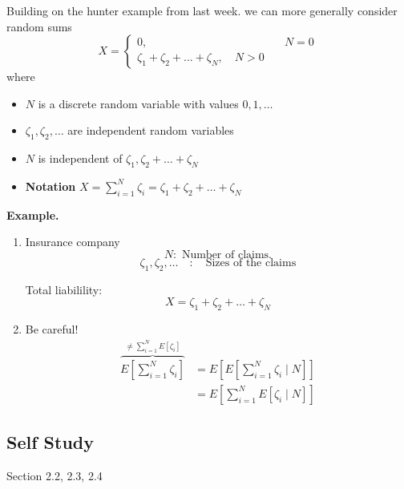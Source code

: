 \documentclass{article}
\theoremstyle{remark}
\begin{document}
Building on the hunter example from last week. we can more generally consider random sums \[
  X = \begin{cases}
    0,  &  \quad  N = 0 \\
    \zeta_{1} + \zeta _{2} + \ldots + \zeta_N , \quad  N >0
  \end{cases}
\]
where
\begin{itemize}
  \item $N$ is a discrete random variable with values $0,1, \ldots$
  \item $\zeta _{1}, \zeta _{2}, \ldots $ are independent random variables
  \item $N$ is independent of $\zeta _{1}, \zeta _{2} + \ldots + \zeta _{N}$
  \item \textbf{Notation}  $X = \sum_{i=1}^{N} \zeta _{i} = \zeta _{1} + \zeta _{2} + \ldots + \zeta _{N}$
\end{itemize}

\begin{tcolorbox}
  \textbf{Example.}
  \begin{enumerate}
    \item Insurance company \[
    N: \text{ Number of claims.}
    \]
  \[
    \zeta _{1} , \zeta _{2} , \ldots \quad  : \quad \text{Sizes of the claims}
  \]

  Total liabilility: \[
  X = \zeta _{1}+ \zeta _{2} + \ldots + \zeta _{N}
  \]
\item  Be careful! \[
    \begin{split}
      \overbrace{E\left[ \sum_{i=1}^{N} \zeta _{i} \right]}^{\neq \sum_{i=1}^{N} E\left[ \zeta _{i} \right]}   & = E\left[ E\left[ \sum_{i=1}^{N} \zeta _{i}  \mid N \right] \right]\\
&= E\left[ \sum_{i=1}^{N} E\left[ \zeta _{i}  \mid  N \right] \right]
    \end{split}
\]
  \end{enumerate}
\end{tcolorbox}

\subsection{Self Study}%
\label{sub:self_study}

Section 2.2, 2.3, 2.4
\end{document}
